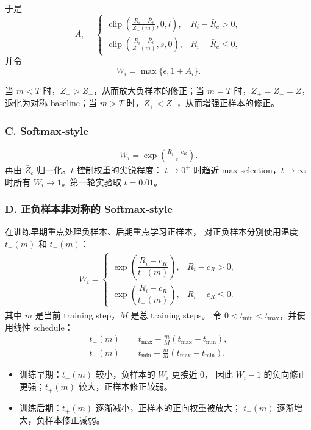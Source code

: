 \documentclass[10pt]{article}
\begin{document}
于是
\begin{equation}
A_i=
\begin{cases}
\displaystyle
\operatorname{clip}
\left(
\frac{R_i-\bar R_c}{Z_+(m)},0,l
\right),
& R_i-\bar R_c>0,\\[10pt]
\displaystyle
\operatorname{clip}
\left(
\frac{R_i-\bar R_c}{Z_-(m)},s,0
\right),
& R_i-\bar R_c\le0,
\end{cases}
\end{equation}
并令
\begin{equation}
W_i=\max\{\epsilon,1+A_i\}.
\end{equation}

当 $m<T$ 时，$Z_+>Z_-$，从而放大负样本的修正；当 $m=T$ 时，$Z_+=Z_-=Z$，退化为对称 baseline；当 $m>T$ 时，$Z_+<Z_-$，从而增强正样本的修正。


\subsubsection*{C. Softmax-style}

\begin{align}
W_i
=\exp\!\left(
\frac{R_i-c_R}{t}
\right).
\end{align}
再由 $\bar Z_c$ 归一化。$t$ 控制权重的尖锐程度：
$t\to0^+$ 时趋近 max selection，$t\to\infty$ 时所有 $W_i\to1$。第一轮实验取 $t=0.01$。

\subsubsection*{D. 正负样本非对称的 Softmax-style}

在训练早期重点处理负样本、后期重点学习正样本，
对正负样本分别使用温度 $t_+(m)$ 和 $t_-(m)$：
\begin{align}
W_i
=
\begin{cases}
\exp\!\left(
\dfrac{R_i-c_R}{t_+(m)}
\right),
& R_i-c_R>0,\\[6pt]
\exp\!\left(
\dfrac{R_i-c_R}{t_-(m)}
\right),
& R_i-c_R\le0.
\end{cases}
\end{align}
其中 $m$ 是当前 training step，$M$ 是总 training steps。
令 $0<t_{\min}<t_{\max}$，并使用线性 schedule：
\begin{align}
t_+(m)
&=t_{\max}-\frac{m}{M}(t_{\max}-t_{\min}), \\
t_-(m)
&=t_{\min}+\frac{m}{M}(t_{\max}-t_{\min}).
\end{align}
\begin{itemize}
  \item 训练早期：$t_-(m)$ 较小，负样本的 $W_i$ 更接近 $0$，
  因此 $W_i-1$ 的负向修正更强；$t_+(m)$ 较大，正样本修正较弱。
  \item 训练后期：$t_+(m)$ 逐渐减小，正样本的正向权重被放大；
  $t_-(m)$ 逐渐增大，负样本修正减弱。
\end{itemize}
\end{document}
